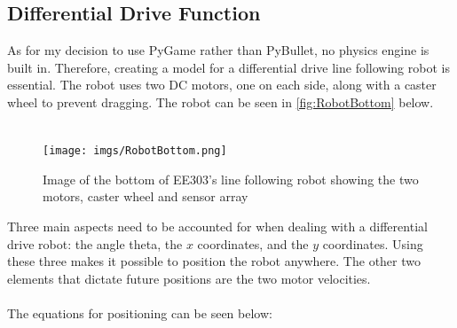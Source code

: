 \documentclass[a4paper,12pt]{article}
\begin{document}
\subsection{Differential Drive Function}
As for my decision to use PyGame rather than PyBullet, no physics engine is built in. Therefore, creating a model for a differential drive line following robot is essential. The robot uses two DC motors, one on each side, along with a caster wheel to prevent dragging. The robot can be seen in \autoref{fig:RobotBottom} below.
\\\\
\begin{figure}[H]
\label{fig:1}{}
\centering
\texttt{[image: imgs/RobotBottom.png]}
\caption{Image of the bottom of EE303's line following robot showing the two motors, caster wheel and sensor array}
\label{fig:RobotBottom}
\end{figure}
\noindent
Three main aspects need to be accounted for when dealing with a differential drive robot: the angle theta, the $x$ coordinates, and the $y$ coordinates. Using these three makes it possible to position the robot anywhere. The other two elements that dictate future positions are the two motor velocities.
\\\\
The equations for positioning can be seen below:
\end{document}
